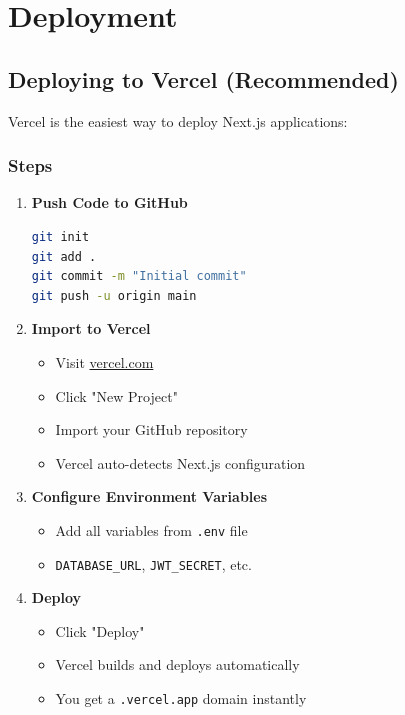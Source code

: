 \documentclass[12pt,a4paper]{article}
\begin{document}
\section{Deployment}

\subsection{Deploying to Vercel (Recommended)}

Vercel is the easiest way to deploy Next.js applications:

\subsubsection{Steps}

\begin{enumerate}
    \item \textbf{Push Code to GitHub}
    \begin{lstlisting}[language=bash]
git init
git add .
git commit -m "Initial commit"
git push -u origin main
    \end{lstlisting}

    \item \textbf{Import to Vercel}
    \begin{itemize}
        \item Visit \href{https://vercel.com}{vercel.com}
        \item Click "New Project"
        \item Import your GitHub repository
        \item Vercel auto-detects Next.js configuration
    \end{itemize}

    \item \textbf{Configure Environment Variables}
    \begin{itemize}
        \item Add all variables from \texttt{.env} file
        \item \texttt{DATABASE\_URL}, \texttt{JWT\_SECRET}, etc.
    \end{itemize}

    \item \textbf{Deploy}
    \begin{itemize}
        \item Click "Deploy"
        \item Vercel builds and deploys automatically
        \item You get a \texttt{.vercel.app} domain instantly
    \end{itemize}
\end{enumerate}
\end{document}
